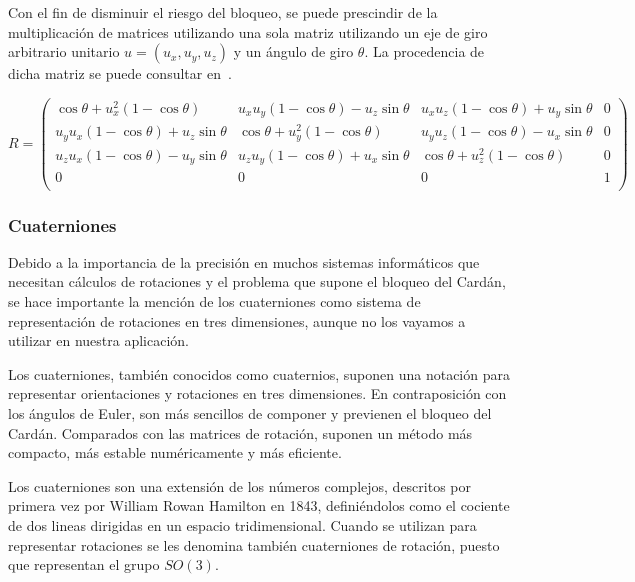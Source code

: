 Con el fin de disminuir el riesgo del bloqueo, se puede prescindir de la
multiplicación de matrices utilizando una sola matriz utilizando un eje de giro
arbitrario unitario $u = (u_x, u_y, u_z)$ y un ángulo de giro $\theta$. La
procedencia de dicha matriz se puede consultar en~\citet{Rodrigues}. 

\begin{equation}
		R = 
		\left(
				\begin{array}{cccc}
						\cos\theta + u_x^2(1-\cos\theta) &
						u_xu_y(1-\cos\theta)-u_z\sin\theta &
						u_xu_z(1-\cos\theta)+u_y\sin\theta & 0 \\

						u_yu_x(1-\cos\theta)+u_z\sin\theta & \cos\theta +
						u_y^2(1-\cos\theta) &
						u_yu_z(1-\cos\theta)-u_x\sin\theta & 0 \\

						u_zu_x(1-\cos\theta)-u_y\sin\theta &
						u_zu_y(1-\cos\theta) + u_x\sin\theta & \cos\theta +
						u_z^2(1-\cos\theta) & 0 \\

						0 & 0 & 0 & 1 \\
				\end{array}
		\right)
\end{equation}

\subsubsection{Cuaterniones}
\label{makereference5.4.2.2}

Debido a la importancia de la precisión en muchos sistemas informáticos que
necesitan cálculos de rotaciones y el problema que supone el bloqueo del Cardán,
se hace importante la mención de los cuaterniones como sistema de representación
de rotaciones en tres dimensiones, aunque no los vayamos a utilizar en nuestra
aplicación. 

Los cuaterniones, también conocidos como cuaternios, suponen una notación para
representar orientaciones y rotaciones en tres dimensiones. En contraposición
con los ángulos de Euler, son más sencillos de componer y previenen el bloqueo
del Cardán. Comparados con las matrices de rotación, suponen un método más
compacto, más estable numéricamente y más eficiente. 

Los cuaterniones son una extensión de los números complejos, descritos por
primera vez por William Rowan Hamilton en 1843, definiéndolos como el cociente
de dos lineas dirigidas en un espacio tridimensional.  Cuando se utilizan para
representar rotaciones se les denomina también cuaterniones de rotación, puesto
que representan el grupo $SO(3)$. 


